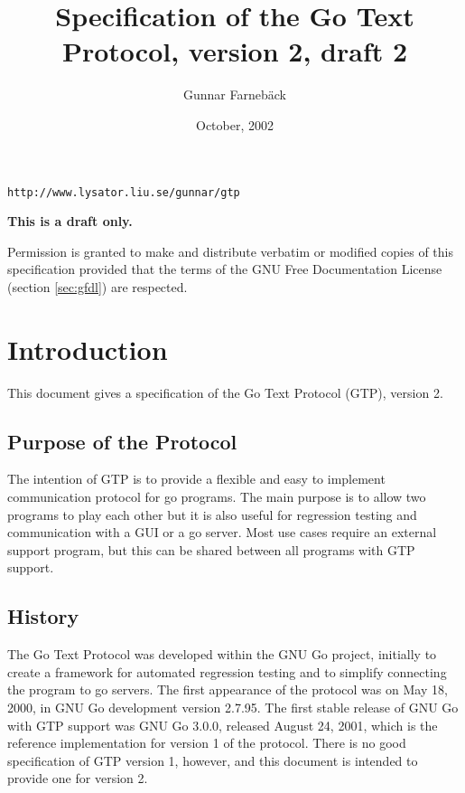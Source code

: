 \documentclass[a4paper]{article}
\begin{document}
\begin{titlepage}
  \title{Specification of the Go Text Protocol, version 2, draft 2}
  \date{October, 2002}
  \author{Gunnar Farneb{\"a}ck}
  \maketitle
  \vfill
  \begin{center}
    \texttt{http://www.lysator.liu.se/\raisebox{-3pt}{\~}gunnar/gtp}
  \end{center}
  \vfill
  \begin{center}
    \textbf{\huge This is a draft only.}  
  \end{center}
  \vfill
  Permission is granted to make and distribute verbatim or modified
  copies of this specification provided that the terms of the GNU Free
  Documentation License (section \ref{sec:gfdl}) are respected.
  \thispagestyle{empty}
\end{titlepage}

\tableofcontents

\newpage
\section{Introduction}
This document gives a specification of the Go Text Protocol (GTP),
version 2.

\subsection{Purpose of the Protocol}

The intention of GTP is to provide a flexible and easy to implement
communication protocol for go programs. The main purpose is to allow
two programs to play each other but it is also useful for regression
testing and communication with a GUI or a go server. Most use cases
require an external support program, but this can be shared between
all programs with GTP support.

\subsection{History}
The Go Text Protocol was developed within the GNU Go project,
initially to create a framework for automated regression testing and
to simplify connecting the program to go servers. The first appearance
of the protocol was on May 18, 2000, in GNU Go development version
2.7.95. The first stable release of GNU Go with GTP support was GNU Go
3.0.0, released August 24, 2001, which is the reference implementation
for version 1 of the protocol. There is no good specification of GTP
version 1, however, and this document is intended to provide one for
version 2.
\end{document}
